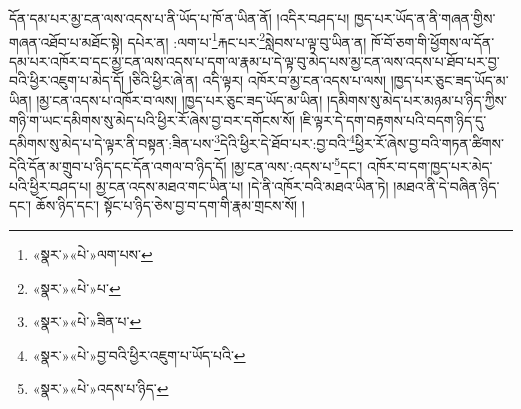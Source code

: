 དོན་དམ་པར་མྱ་ངན་ལས་འདས་པ་ནི་ཡོད་པ་ཁོ་ན་ཡིན་ནོ། །འདིར་བཤད་པ། ཁྱད་པར་ཡོད་ན་ནི་གཞན་གྱིས་གཞན་འཐོབ་པ་མཐོང་སྟེ། དཔེར་ན། :ལག་པ་\footnote{«སྣར་»«པེ་»ལག་པས་}རྐང་པར་\footnote{«སྣར་»«པེ་»པ་}སླེབས་པ་ལྟ་བུ་ཡིན་ན། ཁོ་བོ་ཅག་གི་ཕྱོགས་ལ་དོན་དམ་པར་འཁོར་བ་དང་མྱ་ངན་ལས་འདས་པ་དག་ལ་རྣམ་པ་དེ་ལྟ་བུ་མེད་པས་མྱ་ངན་ལས་འདས་པ་ཐོབ་པར་བྱ་བའི་ཕྱིར་འཇུག་པ་མེད་དོ། །ཅིའི་ཕྱིར་ཞེ་ན། འདི་ལྟར། འཁོར་བ་མྱ་ངན་འདས་པ་ལས། །ཁྱད་པར་ཅུང་ཟད་ཡོད་མ་ཡིན། །མྱ་ངན་འདས་པ་འཁོར་བ་ལས། །ཁྱད་པར་ཅུང་ཟད་ཡོད་མ་ཡིན། །དམིགས་སུ་མེད་པར་མཉམ་པ་ཉིད་ཀྱིས་གཉི་ག་ཡང་དམིགས་སུ་མེད་པའི་ཕྱིར་རོ་ཞེས་བྱ་བར་དགོངས་སོ། །ཇི་ལྟར་དེ་དག་བརྟགས་པའི་བདག་ཉིད་དུ་དམིགས་སུ་མེད་པ་དེ་ལྟར་ནི་བསྟན་:ཟིན་པས་\footnote{«སྣར་»«པེ་»ཟིན་པ་}དེའི་ཕྱིར་དེ་ཐོབ་པར་:བྱ་བའི་\footnote{«སྣར་»«པེ་»བྱ་བའི་ཕྱིར་འཇུག་པ་ཡོད་པའི་}ཕྱིར་རོ་ཞེས་བྱ་བའི་གཏན་ཚིགས་དེའི་དོན་མ་གྲུབ་པ་ཉིད་དང་དོན་འགལ་བ་ཉིད་དོ། །མྱ་ངན་ལས་:འདས་པ་\footnote{«སྣར་»«པེ་»འདས་པ་ཉིད་}དང་། འཁོར་བ་དག་ཁྱད་པར་མེད་པའི་ཕྱིར་བཤད་པ། མྱ་ངན་འདས་མཐའ་གང་ཡིན་པ། །དེ་ནི་འཁོར་བའི་མཐའ་ཡིན་ཏེ། །མཐའ་ནི་དེ་བཞིན་ཉིད་དང་། ཆོས་ཉིད་དང་། སྟོང་པ་ཉིད་ཅེས་བྱ་བ་དག་གི་རྣམ་གྲངས་སོ། །
